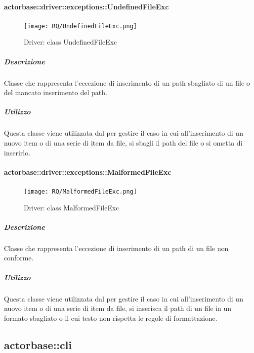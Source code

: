\documentclass{scalatekids-article}
\begin{document}
\paragraph{actorbase::driver::exceptions::UndefinedFileExc}

\begin{figure}[H]
  \begin{center}
    \texttt{[image: RQ/UndefinedFileExc.png]}
    \caption{Driver: class UndefinedFileExc}
  \end{center}
\end{figure}

\subparagraph{Descrizione}

Classe che rappresenta l'eccezione di inserimento di un path sbagliato di un file o del mancato inserimento del path.

\subparagraph{Utilizzo}

Questa classe viene utilizzata dal  per gestire il caso in cui all'inserimento di un nuovo item o di una serie di item da file, si sbagli il path del file o si ometta di inserirlo.

\paragraph{actorbase::driver::exceptions::MalformedFileExc}

\begin{figure}[H]
  \begin{center}
    \texttt{[image: RQ/MalformedFileExc.png]}
    \caption{Driver: class MalformedFileExc}
  \end{center}
\end{figure}

\subparagraph{Descrizione}

Classe che rappresenta l'eccezione di inserimento di un path di un file non conforme.

\subparagraph{Utilizzo}

Questa classe viene utilizzata dal  per gestire il caso in cui all'inserimento di un nuovo item o di una serie di item da file, si inserisca il path di un file in un formato sbagliato o il cui testo non rispetta le regole di formattazione.



\subsection{actorbase::cli}
\label{sec:actorbase::cli}
\end{document}
